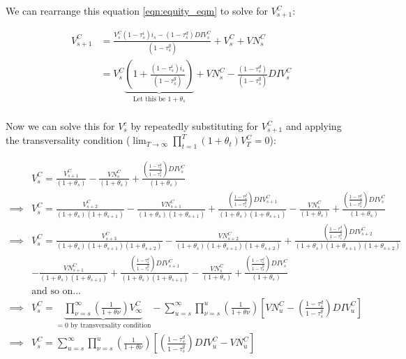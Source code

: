 We can rearrange this equation \ref{eqn:equity_eqm} to solve for $V^{C}_{s+1}$:

\begin{equation}
\label{eqn:v_s1}
\begin{split}
V^{C}_{s+1}&=\frac{V^{C}_{s}(1-\tau^{i}_{s})i_{s}-(1-\tau^{d}_{s})DIV^{C}_{s}}{(1-\tau^{g}_{s})}+V^{C}_{s}+VN^{C}_{s} \\
 & = V^{C}_{s}\underbrace{\left(1+\frac{(1-\tau^{i}_{s})i_{s}}{(1-\tau^{g}_{s})}\right)}_{\text{Let this be }1+\theta_{s}} + VN^{C}_{s} - \frac{(1-\tau^{d}_{s})}{(1-\tau^{g}_{s})}DIV^{C}_{s} \\
\end{split}
\end{equation}

\noindent\noindent Now we can solve this for $V^{c}_{s}$ by repeatedly substituting for $V^{C}_{s+1}$ and applying the transversality condition ($\lim_{T \to \infty} \prod_{t=1}^{T}(1+\theta_{t})V^{C}_{T}=0$):

\begin{equation}
\label{eqn:solve_vs}
\begin{split}
& V^{C}_{s}=\frac{V^{C}_{s+1}}{(1+\theta_{s})} - \frac{VN^{C}_{s}}{(1+\theta_{s})}  + \frac{\left(\frac{1-\tau^{d}_{s}}{1-\tau^{g}_{s}}\right)DIV^{C}_{s}}{(1+\theta_{s})} \\
\implies &  V^{C}_{s}=\frac{V^{C}_{s+2}}{(1+\theta_{s})(1+\theta_{s+1})} - \frac{VN^{C}_{s+1}}{(1+\theta_{s})(1+\theta_{s+1})}  + \frac{\left(\frac{1-\tau^{d}_{s}}{1-\tau^{g}_{s}}\right)DIV^{C}_{s+1}}{(1+\theta_{s})(1+\theta_{s+1})} - \frac{VN^{C}_{s}}{(1+\theta_{s})}  + \frac{\left(\frac{1-\tau^{d}_{s}}{1-\tau^{g}_{s}}\right)DIV^{C}_{s}}{(1+\theta_{s})} \\
\implies &  V^{C}_{s}= \frac{V^{C}_{s+3}}{(1+\theta_{s})(1+\theta_{s+1})(1+\theta_{s+2})} - \frac{VN^{C}_{s+2}}{(1+\theta_{s})(1+\theta_{s+1})(1+\theta_{s+2})}  + \frac{\left(\frac{1-\tau^{d}_{s}}{1-\tau^{g}_{s}}\right)DIV^{C}_{s+2}}{(1+\theta_{s})(1+\theta_{s+1})(1+\theta_{s+2})} \\
& - \frac{VN^{C}_{s+1}}{(1+\theta_{s})(1+\theta_{s+1})}  + \frac{\left(\frac{1-\tau^{d}_{s}}{1-\tau^{g}_{s}}\right)DIV^{C}_{s+1}}{(1+\theta_{s})(1+\theta_{s+1})} - \frac{VN^{C}_{s}}{(1+\theta_{s})}  + \frac{\left(\frac{1-\tau^{d}_{s}}{1-\tau^{g}_{s}}\right)DIV^{C}_{s}}{(1+\theta_{s})} \\
& \text{and so on...} \\
\implies & V^{C}_{s}=\underbrace{\prod_{\nu=s}^{\infty}\left(\frac{1}{1+\theta{\nu}}\right)V^{C}_{\infty}}_{=0 \text{ by transversality condition}} - \sum_{u=s}^{\infty} \prod_{\nu=s}^{u}\left(\frac{1}{1+\theta{\nu}}\right)\left[VN^{C}_{u} - \left(\frac{1-\tau^{d}_{s}}{1-\tau^{g}_{s}}\right)DIV^{C}_{u}\right]\\
\implies & V^{C}_{s}= \sum_{u=s}^{\infty} \prod_{\nu=s}^{u}\left(\frac{1}{1+\theta{\nu}}\right)\left[ \left(\frac{1-\tau^{d}_{s}}{1-\tau^{g}_{s}}\right)DIV^{C}_{u}-VN^{C}_{u}\right]\\
\end{split}
\end{equation}

